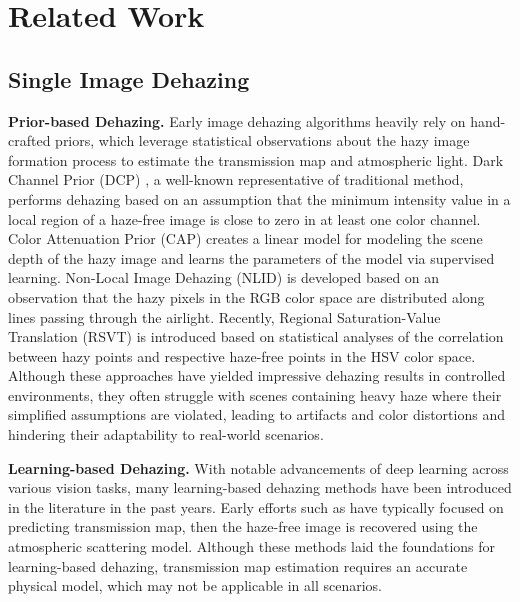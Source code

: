 \section{Related Work}
\label{sec:relatedwork}


\subsection{Single Image Dehazing}
\label{subsec:singleimagedehazing}


\textbf{Prior-based Dehazing.} Early image dehazing algorithms heavily rely on hand-crafted priors, which leverage statistical observations about the hazy image formation process to estimate the transmission map and atmospheric light. Dark Channel Prior (DCP) \cite{he2010single}, a well-known representative of traditional method, performs dehazing based on an assumption that the minimum intensity value in a local region of a haze-free image is close to zero in at least one color channel. Color Attenuation Prior (CAP) \cite{zhu2015fast} creates a linear model for modeling the scene depth of the hazy image and learns the parameters of the model via supervised learning. Non-Local Image Dehazing (NLID) \cite{berman2016non} is developed based on an observation that the hazy pixels in the RGB color space are distributed along lines passing through the airlight. Recently, Regional Saturation-Value Translation (RSVT) \cite{tran2024single} is introduced based on statistical analyses of the correlation between hazy points and respective haze-free points in the HSV color space. Although these approaches have yielded impressive dehazing results in controlled environments, they often struggle with scenes containing heavy haze where their simplified assumptions are violated, leading to artifacts and color distortions and hindering their adaptability to real-world scenarios.


\textbf{Learning-based Dehazing.} With notable advancements of deep learning across various vision tasks, many learning-based dehazing methods have been introduced in the literature in the past years. Early efforts such as \cite{cai2016dehazenet,ren2016single,zhang2018densely} have typically focused on predicting transmission map, then the haze-free image is recovered using the atmospheric scattering model. Although these methods laid the foundations for learning-based dehazing, transmission map estimation requires an accurate physical model, which may not be applicable in all scenarios.

